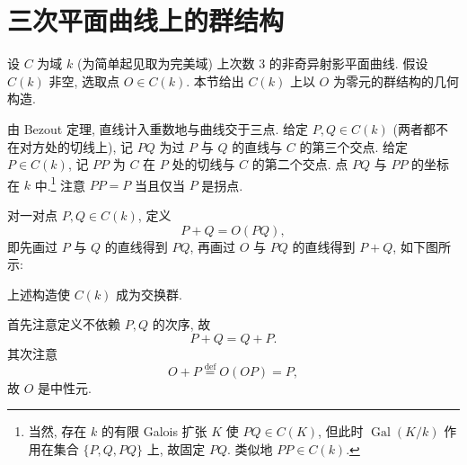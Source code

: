 \section{三次平面曲线上的群结构}\label{sec:1.3}

设 $C$ 为域 $k$ (为简单起见取为完美域) 上次数 $3$ 的非奇异射影平面曲线. 假设 $C(k)$ 非空, 选取点 $O\in C(k)$. 本节给出 $C(k)$ 上以 $O$ 为零元的群结构的几何构造.

由 Bezout 定理, 直线计入重数地与曲线交于三点. 给定 $P,Q\in C(k)$ (两者都不在对方处的切线上), 记 $PQ$ 为过 $P$ 与 $Q$ 的直线与 $C$ 的第三个交点. 给定 $P\in C(k)$, 记 $PP$ 为 $C$ 在 $P$ 处的切线与 $C$ 的第二个交点. 点 $PQ$ 与 $PP$ 的坐标在 $k$ 中.\footnote{当然, 存在 $k$ 的有限 Galois 扩张 $K$ 使 $PQ\in C(K)$, 但此时 $\operatorname{Gal}(K/k)$ 作用在集合 $\{P,Q,PQ\}$ 上, 故固定 $PQ$. 类似地 $PP\in C(k)$.} 注意 $PP = P$ 当且仅当 $P$ 是拐点.

对一对点 $P,Q\in C(k)$, 定义
\[
P + Q = O(PQ),
\]
即先画过 $P$ 与 $Q$ 的直线得到 $PQ$, 再画过 $O$ 与 $PQ$ 的直线得到 $P+Q$, 如下图所示:

\begin{center}
\end{center}

\begin{theorem} \label{thm:1.3.1} 
上述构造使 $C(k)$ 成为交换群.
\end{theorem}

首先注意定义不依赖 $P,Q$ 的次序, 故
\[
P + Q = Q + P.
\]
其次注意
\[
O + P \overset{\text{def}}{=} O(OP) = P,
\]
故 $O$ 是中性元.

